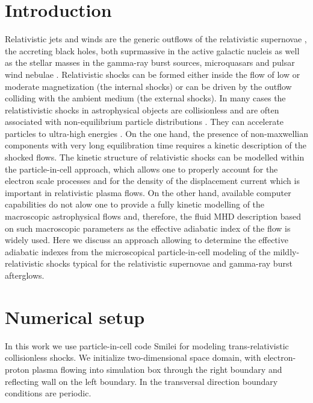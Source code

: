 \documentclass[a4paper]{jpconf}
\begin{document}
	\section{Introduction}
	Relativistic jets and winds are the generic outflows of the relativistic supernovae \cite{2010Natur.463..513S,2007ApJ...667..351W}, the accreting black holes, both suprmassive in the active galactic nucleis  \cite{1984RvMP...56..255B} as well as the stellar masses in the gamma-ray burst sources, microquasars \cite{2019MmSAI..90...57M,1999PhR...314..575P,2014LNP...876.....R} and pulsar wind nebulae \cite{2019MNRAS.488.5690O,2017SSRv..207..235B,2017JPlPh..83e6301K,2019ApJ...876L...8B}. Relativistic shocks can be formed either inside the flow of low or moderate magnetization (the internal shocks) or can be driven by the outflow colliding with the ambient medium (the external shocks). In many cases the relatistivistic shocks in astrophysical objects are collisionless and are often associated with non-equilibrium particle distributions \cite{2012SSRv..173..309B,2015SSRv..191..519S,2017SSRv..207..319P}. They can accelerate particles to ultra-high energies \cite{2009JCAP...11..009L}. On the one hand, the presence of non-maxwellian components with very long equilibration time requires a kinetic description of the shocked flows. The kinetic structure of relativistic shocks can be modelled within the particle-in-cell approach, which allows one to properly account for the electron scale processes and for the density of the displacement current which is important in relativistic plasma flows.  On the other hand, available computer capabilities do not alow one to provide a fully kinetic modelling of the macroscopic astrophysical flows and, therefore, the fluid MHD description based on such macroscopic parameters as the effective adiabatic index of the flow is widely used. Here we discuss an approach allowing to determine the effective adiabatic indexes from the microscopical particle-in-cell modeling of the mildly-relativistic shocks typical for the relativistic supernovae and gamma-ray burst afterglows.   
	
	
	\section{Numerical setup}
	In this work we use particle-in-cell code Smilei \cite{Smilei18} for modeling trans-relativistic collisionless shocks. We initialize two-dimensional space domain, with electron-proton plasma flowing into simulation box through the right boundary and reflecting wall on the left boundary. In the transversal direction boundary conditions are periodic.
	
\end{document}
